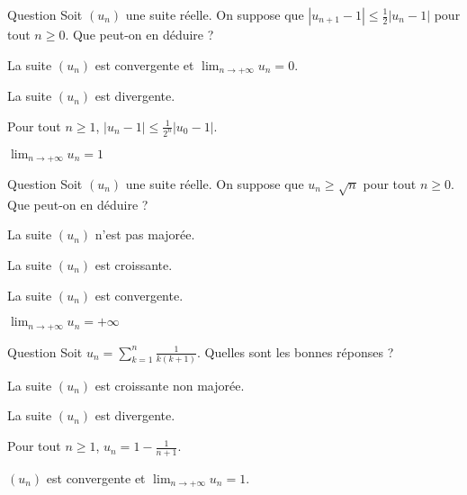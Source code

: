 \begin{multi}[multiple,feedback=
{On vérifie par récurrence que \(\displaystyle |u_n-1|\leq \frac{1}{2^n}|u_0-1|\), et donc, par passage à la limite, \(\displaystyle \lim _{n\to +\infty}(u_n-1)=0\). C'est-à-dire, \(\displaystyle \lim _{n\to +\infty}u_n=1\).
}]{Question}
Soit \((u_n)\) une suite réelle. On suppose que \(\displaystyle |u_{n+1}-1|\leq \frac{1}{2}|u_n-1|\) pour tout \(n\geq 0\). Que peut-on en déduire ?

    \item La suite \((u_n)\) est convergente et \(\displaystyle \lim _{n\to +\infty}u_n=0\).
    \item La suite \((u_n)\) est divergente.
    \item* Pour tout \(n\geq 1\), \(\displaystyle |u_n-1|\leq \frac{1}{2^n}|u_0-1|\).
    \item* \(\displaystyle \lim _{n\to +\infty}u_n=1\)
\end{multi}


\begin{multi}[multiple,feedback=
{Si \((u_n)\) était majorée, il en serait de même pour \(\sqrt{n}\) ce qui est absurde. Donc \((u_n)\) est une suite non majorée. Par passage à la limite, on a :
\[\lim _{n\to +\infty}u_n\geq \lim _{n\to +\infty}\sqrt{n}=+\infty\Rightarrow \displaystyle \lim _{n\to +\infty}u_n=+\infty.\]
}]{Question}
Soit \((u_n)\) une suite réelle. On suppose que \(\displaystyle u_n\geq \sqrt{n}\) pour tout \(n\geq 0\). Que peut-on en déduire ?

    \item* La suite \((u_n)\) n'est pas majorée.
    \item La suite \((u_n)\) est croissante.
    \item La suite \((u_n)\) est convergente.
    \item* \(\displaystyle \lim _{n\to +\infty}u_n=+\infty\)
\end{multi}


\begin{multi}[multiple,feedback=
{Le terme \(u_n\) est une somme télescopique. En effet, on vérifie que, pour tout \(k\geq 1\),
\[\frac{1}{k(k+1)}=\frac{1}{k}-\frac{1}{k+1}\Rightarrow u_n=1-\frac{1}{n+1}.\]
Donc \((u_n)\) est convergente et sa même limite est \(1\).
}]{Question}
Soit \(\displaystyle u_n=\sum _{k=1}^n\frac{1}{k(k+1)}\). Quelles sont les bonnes réponses ?

    \item La suite \((u_n)\) est croissante non majorée.
    \item La suite \((u_n)\) est divergente.
    \item* Pour tout \(n\geq 1\), \(\displaystyle u_n=1-\frac{1}{n+1}\).
    \item* \((u_n)\) est convergente et \(\displaystyle \lim _{n\to +\infty}u_n=1\).
\end{multi}


